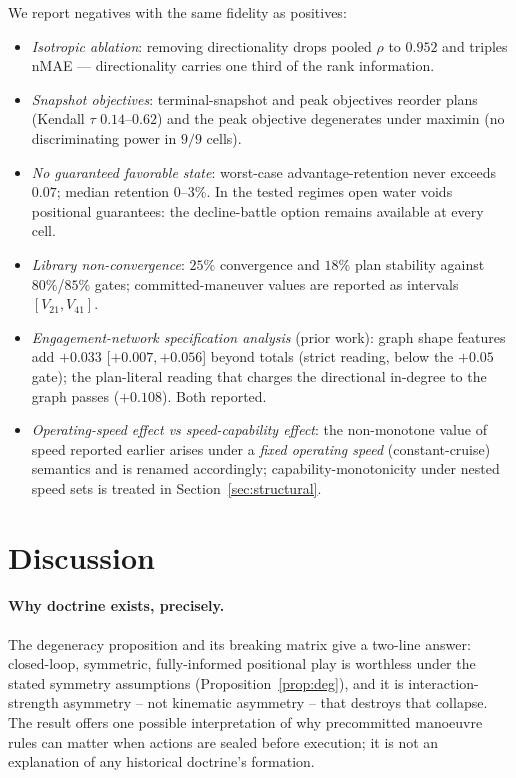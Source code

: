 \documentclass[12pt,a4paper]{article}
\begin{document}
We report negatives with the same fidelity as positives:
\begin{itemize}
\item \emph{Isotropic ablation}: removing directionality drops
pooled $\rho$ to $0.952$ and triples nMAE --- directionality carries one
third of the rank information.
\item \emph{Snapshot objectives}: terminal-snapshot and peak
objectives reorder plans (Kendall $\tau$ $0.14$--$0.62$) and the peak
objective degenerates under maximin (no discriminating power in $9/9$
cells).
\item \emph{No guaranteed favorable state}: worst-case
advantage-retention never exceeds $0.07$; median retention $0$--$3\%$.
In the tested regimes open water voids positional guarantees: the
decline-battle option remains available at every cell.
\item \emph{Library non-convergence}: $25\%$ convergence and $18\%$
plan stability against $80\%$/$85\%$ gates; committed-maneuver values are
reported as intervals $[V_{21},V_{41}]$.
\item \emph{Engagement-network specification analysis} (prior work): graph
shape features add $+0.033$ [$+0.007,+0.056$] beyond totals (strict
reading, below the $+0.05$ gate); the plan-literal reading that charges
the directional in-degree to the graph passes ($+0.108$).  Both reported.
\item \emph{Operating-speed effect vs speed-capability effect}: the
non-monotone value of speed reported earlier arises under a
\emph{fixed operating speed} (constant-cruise) semantics and is renamed
accordingly; capability-monotonicity under nested speed sets is treated
in Section~\ref{sec:structural}.
\end{itemize}

\section{Discussion}\label{sec:discussion}

\paragraph{Why doctrine exists, precisely.}  The degeneracy proposition and
its breaking matrix give a two-line answer: closed-loop, symmetric,
fully-informed positional play is worthless under the stated symmetry
assumptions (Proposition~\ref{prop:deg}), and it is interaction-strength
asymmetry -- not kinematic asymmetry -- that destroys that collapse.  The result offers one possible interpretation of why precommitted
manoeuvre rules can matter when actions are sealed before execution; it is
not an explanation of any historical doctrine's formation.
\end{document}
